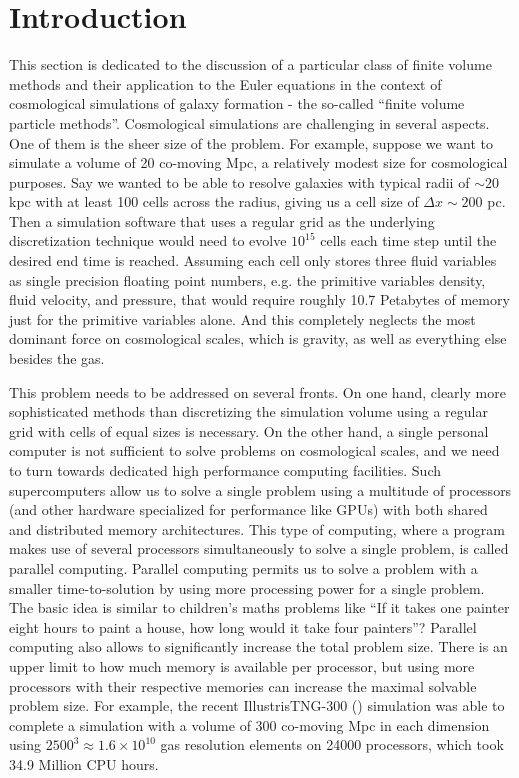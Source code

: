 \chapter{Introduction}

This section is dedicated to the discussion of a particular class of finite volume methods and
their application to the Euler equations in the context of cosmological simulations of galaxy
formation - the so-called ``finite volume particle methods''.
Cosmological simulations are challenging in several aspects. One of them is the sheer size of the
problem. For example, suppose we want to simulate a volume of 20 co-moving Mpc, a relatively modest
size for cosmological purposes. Say we wanted to be able to resolve galaxies with typical radii of
$\sim 20$ kpc with at least 100 cells across the radius, giving us a cell size of $\Delta x \sim
200$ pc. Then a simulation software that uses a regular grid as the underlying discretization
technique would need to evolve $10^{15}$ cells each time step until the desired end time is reached.
Assuming each cell only stores three fluid variables as single precision floating point numbers,
e.g. the primitive variables density, fluid velocity, and pressure, that would require roughly 10.7
Petabytes of memory just for the primitive variables alone. And this completely neglects the most
dominant force on cosmological scales, which is gravity, as well as everything else besides the gas.

This problem needs to be addressed on several fronts. On one hand, clearly more sophisticated
methods than discretizing the simulation volume using a regular grid with cells of equal sizes is
necessary. On the other hand, a single personal computer is not sufficient to solve problems on
cosmological scales, and we need to turn towards dedicated high performance computing facilities.
Such supercomputers allow us to solve a single problem using a multitude of processors (and other
hardware specialized for performance like GPUs) with both shared and distributed memory
architectures. This type of computing, where a program makes use of several processors
simultaneously to solve a single problem, is called parallel computing. Parallel computing permits
us to solve a problem with a smaller time-to-solution by using more processing power for a single
problem. The basic idea is similar to children's maths problems like ``If it takes one painter eight hours to paint a house, how long would it take four painters''? Parallel computing also allows to
significantly increase the total problem size. There is an upper limit to how much memory is
available per processor, but using more processors with their respective memories can increase the
maximal solvable problem size. For example, the recent IllustrisTNG-300
(\cite{pillepichFirstResultsIllustrisTNG2018}) simulation was able to complete a simulation with a
volume of 300 co-moving Mpc in each dimension using $2500^3 \approx 1.6 \times 10^{10}$ gas
resolution elements on 24000 processors, which took 34.9 Million CPU hours.

